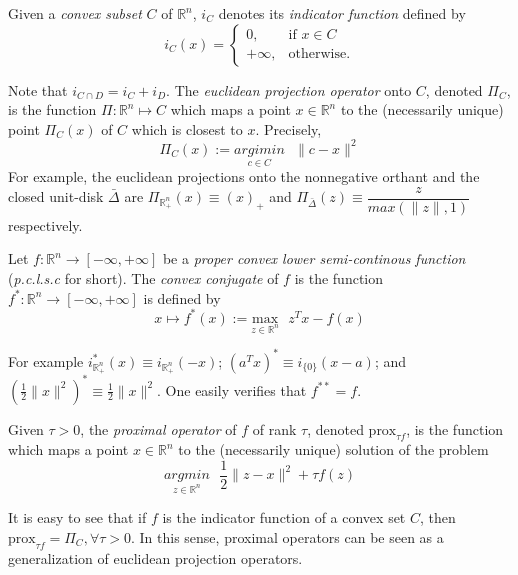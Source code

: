 \documentclass{article} %
\begin{document}
Given a \textit{convex subset} $C$ of $\mathbb{R}^n$, $i_C$ denotes its \textit{indicator function} defined by
\begin{equation}
  i_C(x) = \begin{cases}
    0, &\mbox{if } x \in C\\
    +\infty, &\mbox{otherwise}.
    \end{cases}
  \end{equation}

Note that $i_{C \cap D} = i_C + i_D$. The \textit{euclidean projection operator} onto $C$, denoted $\Pi_C$, is the function
$\Pi: \mathbb{R}^n \mapsto C$ which maps a point $x \in \mathbb{R}^n$ to the (necessarily unique) point $\Pi_C(x)$ of $C$ which is closest to $x$. Precisely,
\begin{equation}
  \Pi_C(x) := \underset{c \in C}{argimin}\text{ }\|c - x\|^2
\end{equation}
For example, the euclidean projections onto the nonnegative orthant and the closed unit-disk $\bar{\Delta}$
are $\Pi_{\mathbb{R}^n_+}(x) \equiv (x)_+$ and $\Pi_{\bar{\Delta}}(z) \equiv \dfrac{z}{max(\|z\|, 1)}$ respectively.

Let $f : \mathbb{R}^n \rightarrow [-\infty, +\infty]$ be a \textit{proper convex lower semi-continous function}
(\textit{p.c.l.s.c} for short). The \textit{convex conjugate} of $f$ is the function $f^*: \mathbb{R}^n \rightarrow [-\infty, +\infty]$ is defined by
\begin{equation}
  x \mapsto f^*(x) := \underset{z \in \mathbb{R}^n}{\text{max}}\text{ }z^Tx - f(x)
\end{equation}

For example $i_{\mathbb{R}^{n}_+}^*(x) \equiv i_{\mathbb{R}^{n}_+}(-x)$; $(a^Tx)^* \equiv i_{\{0\}}(x - a)$; and $(\frac{1}{2}\|x\|^2)^* \equiv \frac{1}{2}\|x\|^2$. One easily verifies that $f^{**} = f$.

Given $\tau > 0$, the \textit{proximal operator} of $f$ of rank
$\tau$, denoted $\text{prox}_{\tau f}$, is the function which maps a point $x \in \mathbb{R}^n$ to the (necessarily
unique) solution of the problem
\begin{equation}
  \underset{z \in \mathbb{R}^n}{argmin}\text{ }\frac{1}{2}\|z - x\|^2 + \tau f(z)
\end{equation}

It is easy to see that if $f$ is the indicator function of a convex set $C$, then $\text{prox}_{\tau f} = \Pi_C, \forall \tau > 0$. In this sense, proximal operators can be seen
as a generalization of euclidean projection operators.
\end{document}
